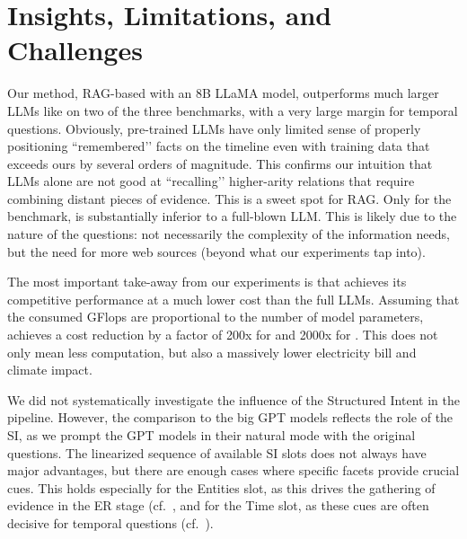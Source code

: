 \label{sec:disc}
\section{Insights, Limitations, and Challenges}


 Our method, RAG-based \method with an 8B LLaMA model, outperforms much larger LLMs like \gptfour on two of the three benchmarks, with a very large margin for temporal questions. Obviously, pre-trained LLMs have only limited sense of properly positioning ``remembered’’ facts on the timeline even with training data that exceeds ours by several orders of magnitude. This confirms our intuition that LLMs alone are not good at ``recalling’’  higher-arity relations that require combining distant pieces of evidence. This is a sweet spot for RAG. Only for 
the \crag benchmark, \method is substantially inferior to a full-blown LLM. This is likely due to the nature of the questions: not necessarily the complexity of the information needs, but the need for more web sources (beyond what our experiments tap into).

\vspace{0.2cm}
 The most important take-away from our experiments is that \method achieves its competitive performance at a much lower cost than the full LLMs. Assuming that the consumed GFlops are proportional to the number of model parameters, \method achieves a cost reduction by a factor of 200x for \gptthree and 2000x for \gptfour. This does not only mean less computation, but also a massively lower electricity bill and climate impact.  

\vspace{0.2cm}
 We did not systematically investigate the influence of the Structured Intent in the \method pipeline. However, the comparison to the big GPT models reflects the role of the SI, as we prompt the GPT models in their natural mode with the original questions. The linearized sequence of available SI slots does not always have major advantages, but there are enough cases where specific facets provide crucial cues. This holds especially for the Entities slot, as this drives the gathering of evidence in the ER stage (cf.~\cite{Christmann-CONVINSE:SIGIR2022}, and for the Time slot, as these cues are often decisive for temporal questions (cf.~\cite{Jia-FAITH:WWW2024}).

